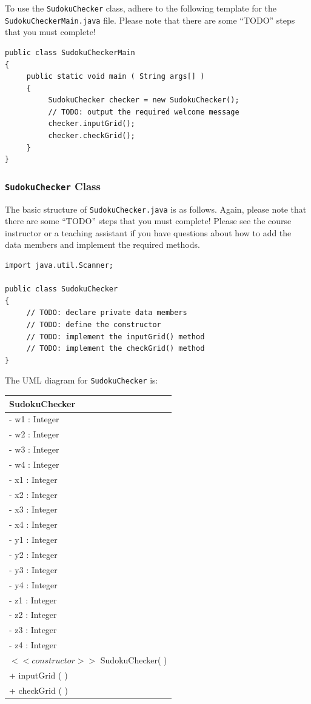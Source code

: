 To use the {\tt SudokuChecker} class, adhere to the following template for the {\tt SudokuCheckerMain.java} file. Please
note that there are some ``TODO'' steps that you must complete!

\begin{verbatim}
public class SudokuCheckerMain
{
     public static void main ( String args[] )
     {
          SudokuChecker checker = new SudokuChecker();
          // TODO: output the required welcome message
          checker.inputGrid();
          checker.checkGrid();
     }
}
\end{verbatim}

\subsubsection*{{\tt SudokuChecker} Class}

\noindent The basic structure of {\tt SudokuChecker.java} is as follows. Again, please note that there are some ``TODO''
steps that you must complete! Please see the course instructor or a teaching assistant if you have questions about how
to add the data members and implement the required methods.

\begin{verbatim}
import java.util.Scanner;

public class SudokuChecker
{
     // TODO: declare private data members
     // TODO: define the constructor
     // TODO: implement the inputGrid() method
     // TODO: implement the checkGrid() method
}
\end{verbatim}
The UML diagram for {\tt SudokuChecker} is:
\begin{tabular}{|l|}
\hline
\textbf{SudokuChecker} \\
\hline
- w1 : Integer\\
- w2 : Integer\\
- w3 : Integer\\
- w4 : Integer\\
- x1 : Integer\\
- x2 : Integer\\
- x3 : Integer\\
- x4 : Integer\\
- y1 : Integer\\
- y2 : Integer\\
- y3 : Integer\\
- y4 : Integer\\
- z1 : Integer\\
- z2 : Integer\\
- z3 : Integer\\
- z4 : Integer\\
\hline
$<<constructor>>$ SudokuChecker( )\\
\hline
+ inputGrid ( )\\
+ checkGrid ( )\\
\hline
\end{tabular}

